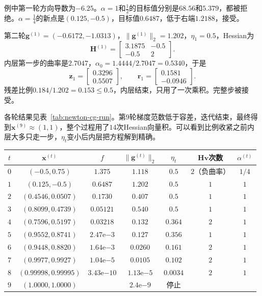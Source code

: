 \begin{enumerate}
 例中第一轮方向导数为$-6.25$。$\alpha=1$和$\tfrac12$的目标值分别是$68.56$和$5.379$，都被拒绝。$\alpha=\tfrac14$的新点是$(0.125,-0.5)$，目标值$0.6487$，低于右端$1.2188$，接受。

 第二轮$\bm{g}^{(1)}=(-0.6172,-1.0313)$，$\lVert\bm{g}^{(1)}\rVert_2=1.202$，$\eta_1=0.5$，Hessian为
 \[
  \bm{H}^{(1)}=\begin{bmatrix}3.1875&-0.5\\-0.5&2\end{bmatrix}.
 \]
 内层第一步的曲率是$2.7047$，$\alpha_0=1.4444/2.7047=0.5340$，于是
 \[
  \bm{z}_1=\begin{bmatrix}0.3296\\0.5507\end{bmatrix},\qquad \bm{r}_1=\begin{bmatrix}0.1581\\-0.0946\end{bmatrix}.
 \]
 残差比例$0.184/1.202=0.153\leq0.5$，内层结束，只用了一次乘积。完整步被接受。
\end{enumerate}

各轮结果见表~\ref{tab:newton-cg-run}。第$9$轮梯度范数低于容差，迭代结束，最终得到$\bm{x}^{(9)}\approx(1,1)$，整个过程用了$14$次Hessian向量积。可以看到比例收紧之前内层大多只走一步，$\eta_t$变小后内层把方程解到精确。

\begin{BookInlineTable}
  \centering
  \begin{tabular}{@{}ccccccc@{}}
    \toprule
    $t$ & $\bm{x}^{(t)}$ & $f$ & $\lVert\bm{g}^{(t)}\rVert_2$ & $\eta_t$ & $\bm{H}\bm{v}$次数 & $\alpha^{(t)}$ \\
    \midrule
    $0$ & $(-0.5,0.75)$ & $1.375$ & $1.118$ & $0.5$ & $2$（负曲率）& $1/4$ \\
    $1$ & $(0.125,-0.5)$ & $0.6487$ & $1.202$ & $0.5$ & $1$ & $1$ \\
    $2$ & $(0.4546,0.0507)$ & $0.1730$ & $0.407$ & $0.5$ & $1$ & $1$ \\
    $3$ & $(0.8099,0.4739)$ & $0.05121$ & $0.540$ & $0.5$ & $1$ & $1$ \\
    $4$ & $(0.7596,0.5197)$ & $0.03218$ & $0.132$ & $0.364$ & $2$ & $1$ \\
    $5$ & $(0.9552,0.8741)$ & $2.47\mathrm{e}{-3}$ & $0.127$ & $0.356$ & $1$ & $1$ \\
    $6$ & $(0.9448,0.8820)$ & $1.64\mathrm{e}{-3}$ & $0.0260$ & $0.161$ & $2$ & $1$ \\
    $7$ & $(0.9977,0.9927)$ & $1.04\mathrm{e}{-5}$ & $0.0105$ & $0.102$ & $2$ & $1$ \\
    $8$ & $(0.99998,0.99995)$ & $3.43\mathrm{e}{-10}$ & $1.13\mathrm{e}{-5}$ & $0.0034$ & $2$ & $1$ \\
    $9$ & $(1.0000,1.0000)$ & & $2.4\mathrm{e}{-9}$ & 停止 & & \\
    \bottomrule
  \end{tabular}
  \caption{Newton-CG在目标~\eqref{eq:newton-running-objective}上的运行，$\eta_t=\min\{0.5,\sqrt{\lVert\bm{g}^{(t)}\rVert_2}\}$。第$0$轮内层因负曲率提前结束。}
  \label{tab:newton-cg-run}
\end{BookInlineTable}

